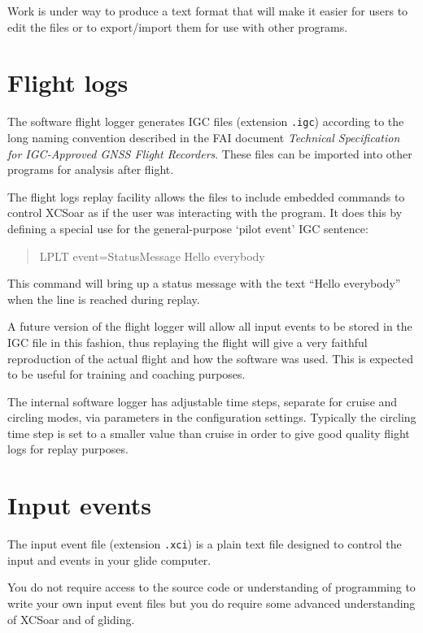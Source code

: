 \documentclass[a4paper,12pt]{refrep}
\begin{document}
Work is under way to produce a text format that will make it easier
for users to edit the files or to export/import them for use with other
programs.

\section{Flight logs}

The software flight logger generates IGC files (extension \verb|.igc|)
according to the long naming convention described in the FAI 
document {\em Technical Specification for IGC-Approved GNSS Flight Recorders}.  
These files can be imported into other programs for analysis after flight.

The flight logs replay facility allows the files to include 
embedded commands to control XCSoar as if the user was interacting
with the program.  It does this by defining a special use for the
general-purpose `pilot event' IGC sentence:
\begin{quote}
LPLT event=StatusMessage Hello everybody
\end{quote}
This command will bring up a status message with the text ``Hello everybody''
when the line is reached during replay.

A future version of the flight logger will allow all input events to
be stored in the IGC file in this fashion, thus replaying the flight
will give a very faithful reproduction of the actual flight and how
the software was used.  This is expected to be useful for training and
coaching purposes.

The internal software logger has adjustable time steps, separate for
cruise and circling modes, via parameters in the configuration
settings.  Typically the circling time step is set to a smaller value
than cruise in order to give good quality flight logs for replay
purposes.

\section{Input events}

The input event file (extension \verb|.xci|) is a plain text file
designed to control the input and events in your glide computer.

You do not require access to the source code or understanding of
programming to write your own input event files but you do require
some advanced understanding of XCSoar and of gliding.
\end{document}
